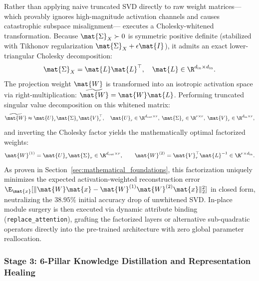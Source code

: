 Rather than applying naive truncated SVD directly to raw weight matrices—which provably ignores high-magnitude activation channels and causes catastrophic subspace misalignment—\neuralops{} executes a Cholesky-whitened transformation.
Because $\mat{\Sigma}_X \succ 0$ is symmetric positive definite (stabilized with Tikhonov regularization $\mat{\Sigma}_X + \epsilon \mat{I}$), it admits an exact lower-triangular Cholesky decomposition:
\begin{equation}
\label{eq:cholesky_factorization}
\mat{\Sigma}_X = \mat{L}\mat{L}^\top, \quad \mat{L} \in \R^{d_{\text{in}} \times d_{\text{in}}}.
\end{equation}
The projection weight $\mat{W}$ is transformed into an isotropic activation space via right-multiplication: $\widetilde{\mat{W}} = \mat{W}\mat{L}$.
Performing truncated singular value decomposition on this whitened matrix:
\begin{equation}
\label{eq:intro:whitened_svd}
\widetilde{\mat{W}} \approx \mat{U}_r \mat{\Sigma}_r \mat{V}_r^\top, \quad \mat{U}_r \in \R^{d_{\text{out}} \times r}, \; \mat{\Sigma}_r \in \R^{r \times r}, \; \mat{V}_r \in \R^{d_{\text{in}} \times r},
\end{equation}
and inverting the Cholesky factor yields the mathematically optimal factorized weights:
\begin{equation}
\label{eq:whitened_pullback}
\mat{W}^{(1)} = \mat{U}_r \mat{\Sigma}_r \in \R^{d_{\text{out}} \times r}, \qquad \mat{W}^{(2)} = \mat{V}_r^\top \mat{L}^{-1} \in \R^{r \times d_{\text{in}}}.
\end{equation}
As proven in Section~\ref{sec:mathematical_foundations}, this factorization uniquely minimizes the expected activation-weighted reconstruction error $\E_{\mat{x}}[\|\mat{W}\mat{x} - \mat{W}^{(1)}\mat{W}^{(2)}\mat{x}\|_2^2]$ in closed form, neutralizing the $38.95\%$ initial accuracy drop of unwhitened SVD.
In-place module surgery is then executed via dynamic attribute binding (\texttt{replace\_attention}), grafting the factorized layers or alternative sub-quadratic operators directly into the pre-trained architecture with zero global parameter reallocation.

\subsubsection{Stage 3: 6-Pillar Knowledge Distillation and Representation Healing}
\label{subsubsec:stage3_healing}

